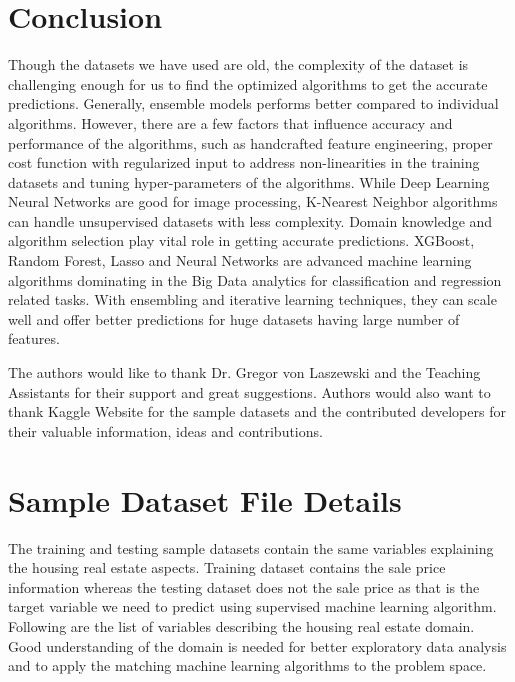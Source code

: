 \documentclass[sigconf]{acmart}
\begin{document}
	
	\section{Conclusion}
	
	    Though the datasets we have used are old, the complexity of the dataset is challenging enough for us to find the optimized algorithms to get the accurate predictions. Generally, ensemble models performs better compared to individual algorithms. However, there are a few factors that influence accuracy and performance of the algorithms, such as handcrafted feature engineering, proper cost function with regularized input to address non-linearities in the training datasets and tuning hyper-parameters of the algorithms. While Deep Learning Neural Networks are good for image processing, K-Nearest Neighbor algorithms can handle unsupervised datasets with less complexity. Domain knowledge and algorithm selection play vital role in getting accurate predictions. XGBoost, Random Forest, Lasso and Neural Networks are advanced machine learning algorithms dominating in the Big Data analytics for classification and regression related tasks. With ensembling and iterative learning techniques, they can scale well and offer better predictions for huge datasets having large number of features. 
	
	\appendix
	
	\nocite{*}
	
	\begin{acks}	
		The authors would like to thank Dr. Gregor von Laszewski and the Teaching Assistants for their support and great suggestions. Authors would also want to thank Kaggle Website for the sample datasets and the contributed developers for their valuable information, ideas and contributions.		
	\end{acks}
	
	
	
	 	
	
	\section{Sample Dataset File Details}
	The training and testing sample datasets contain the same variables explaining the housing real estate aspects. Training dataset contains the sale price information whereas the testing dataset does not the sale price as that is the target variable we need to predict using supervised machine learning algorithm. Following are the list of variables describing the housing real estate domain. Good understanding of the domain is needed for better exploratory data analysis and to apply the matching machine learning algorithms to the problem space.
	
\end{document}
